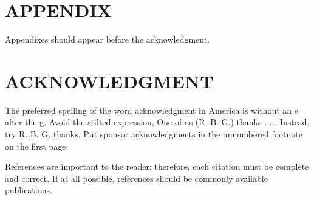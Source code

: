 \documentclass[letterpaper, 10 pt, conference]{ieeeconf}  %
\begin{document}
\section*{APPENDIX}

Appendixes should appear before the acknowledgment.

\section*{ACKNOWLEDGMENT}

The preferred spelling of the word acknowledgment in America is without an e after the g. Avoid the stilted expression, One of us (R. B. G.) thanks . . .  Instead, try R. B. G. thanks. Put sponsor acknowledgments in the unnumbered footnote on the first page.




References are important to the reader; therefore, each citation must be complete and correct. If at all possible, references should be commonly available publications.
\end{document}

